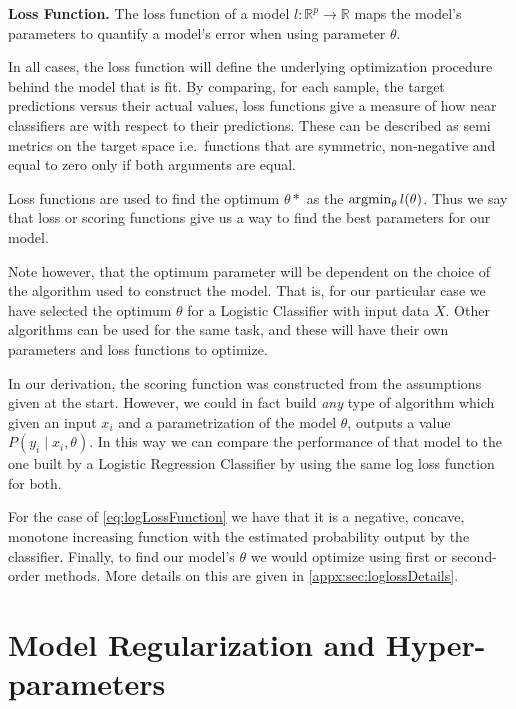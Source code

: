 \begin{definition}{\textbf{Loss Function.}}
The loss function of a model $l: \mathbb{R}^{ p} \rightarrow  \mathbb{R} $ maps the model's parameters to quantify a model's error when using parameter $\theta$.
\end{definition}

In all cases, the loss function will define the underlying optimization procedure behind the model that is fit.
By comparing, for each sample, the target predictions versus their actual values, loss functions give a measure of how near classifiers are with respect to their predictions.
These can be described as semi metrics on the target space i.e.\ functions that are symmetric, non-negative and equal to zero only if both arguments are equal.

Loss functions are used to find the optimum $\theta*$ as the $\operatorname*{argmin}_{\theta} l(\theta) $.
Thus we say that loss or scoring functions give us a way to find the best parameters for our model.

Note however, that the optimum parameter will be dependent on the choice of the algorithm used to construct the model.
That is, for our particular case we have selected the optimum $\theta$ for a Logistic Classifier with input data $X$.
Other algorithms can be used for the same task, and these will have their own parameters and loss functions to optimize.

In our derivation, the scoring function was constructed from the assumptions given at the start.
However, we could in fact build \textit{any} type of algorithm which given an input $x_i$ and a parametrization of the model $\theta$, outputs a value $P(y_i \mid x_i,\theta)$.
In this way we can compare the performance of that model to the one built by a Logistic Regression Classifier by using the same log loss function for both.

For the case of \cref{eq:logLossFunction} we have that it is a negative, concave, monotone increasing function with the estimated probability output by the classifier.
Finally, to find our model's $\theta$ we would optimize using first or second-order methods. More details on this are given in \cref{appx:sec:loglossDetails}.


\section{Model Regularization and Hyper-parameters}\label{section-hyperParametersRegularization}


